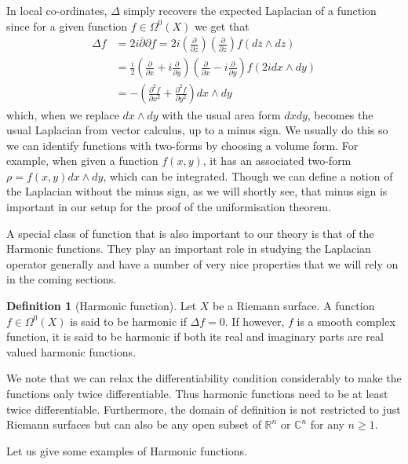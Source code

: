 \documentclass[11pt]{report}
\theoremstyle{definition}
\newtheorem{defn}[thm]{Definition}
\begin{document}
In local co-ordinates, $\Delta$ simply recovers the expected Laplacian of a function since for a given function $f\in \Omega^0(X)$ we get that 
\begin{align*}
  \Delta f &= 2i\overline{\partial }\partial f = 2i(\frac{\partial}{\partial\overline{z}})(\frac{\partial}{\partial z})f(d\overline{z}\wedge dz) \\
  &=\frac{i}{2}(\frac{\partial}{\partial x} + i\frac{\partial}{\partial y})(\frac{\partial}{\partial x} - i\frac{\partial}{\partial y})f(2idx\wedge dy) \\
  &= -(\frac{\partial^2 f}{\partial x^2} + \frac{\partial^2 f}{\partial y^2})dx\wedge dy 
\end{align*}
which, when we replace $dx\wedge dy$ with the usual area form $dxdy$, becomes the usual Laplacian from vector calculus, up to a minus sign. We usually do this so we can identify functions with two-forms by choosing a volume form. For example, when given a function $f(x,y)$, it has an associated two-form $\rho = f(x,y) dx\wedge dy$, which can be integrated. Though we can define a notion of the Laplacian without the minus sign, as we will shortly see, that minus sign is important in our setup for the proof of the uniformisation theorem. 

A special class of function that is also important to our theory is that of the 
Harmonic functions. They play an important role in studying the Laplacian operator generally and have a number of very nice properties that we will rely on in the coming sections.
\begin{defn}[Harmonic function]\label{HarmonicDef}
  Let $X$ be a Riemann surface. A function $f\in \Omega^0(X)$ is said to be harmonic if $\Delta f = 0$. If however, $f$ is a smooth complex function, it is said to be harmonic if both its real and imaginary parts are real valued harmonic functions.
\end{defn}
We note that we can relax the differentiability condition considerably to make the functions only twice differentiable. Thus harmonic functions need to be at least twice differentiable. Furthermore, the domain of definition is not restricted to just Riemann surfaces but can also be any open subset of $\mathbb{R}^n$ or $\mathbb{C}^n$ for any $n\geq 1$. 

Let us give some examples of Harmonic functions.
\end{document}

